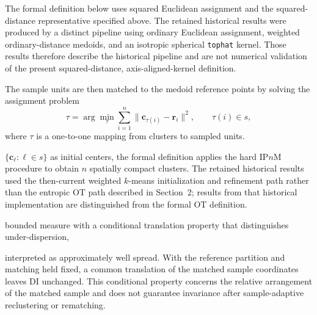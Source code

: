The formal definition below uses squared Euclidean assignment and the
squared-distance representative specified above. The retained historical
results were produced by a distinct pipeline using ordinary Euclidean
assignment, weighted ordinary-distance medoids, and an isotropic spherical
\texttt{tophat} kernel. Those results therefore describe the historical
pipeline and are not numerical validation of the present squared-distance,
axis-aligned-kernel definition.

The sample units are then matched to the medoid reference points by solving the
assignment problem
\[
\tau
=
\arg\min_{\tau}
\sum_{i=1}^n
\|\bm c_{\tau(i)}-\bm r_i\|^2,
\qquad
\tau(i)\in s,
\]
where \(\tau\) is a one-to-one mapping from clusters to sampled units.

\(\{\bm c_\ell:\ell\in s\}\) as initial centers, the formal definition applies
the hard IP\(n\)M procedure to obtain \(n\) spatially compact clusters.
The retained historical results used the then-current weighted \(k\)-means
initialization and refinement path rather than the entropic OT path described
in Section~2; results from that historical implementation are distinguished
from the formal OT definition.

bounded measure with a conditional translation property that distinguishes under-dispersion,

interpreted as approximately well spread. With the reference partition and matching held fixed, a common translation of the matched sample coordinates leaves DI unchanged. This conditional property concerns the relative arrangement of the matched sample and does not guarantee invariance after sample-adaptive reclustering or rematching.

